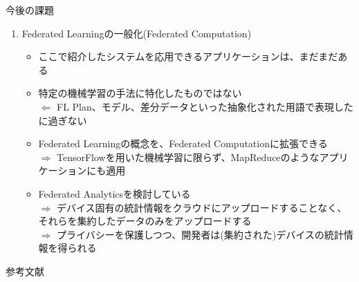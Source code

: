 \documentclass[dvipdfmx,notheorems,t]{beamer}
\begin{document}
\begin{frame}{今後の課題}
\begin{enumerate}
	\framebreak
	
	\item Federated Learningの一般化(Federated Computation)
	\begin{itemize}
		\item ここで紹介したシステムを応用できるアプリケーションは、まだまだある
		\newline
		
		\item 特定の機械学習の手法に特化したものではない \\
		$\Leftarrow$ FL Plan、モデル、差分データといった抽象化された用語で表現したに過ぎない
		\newline
		
		\item Federated Learningの概念を、Federated Computationに拡張できる \\
		$\Rightarrow$ TensorFlowを用いた機械学習に限らず、MapReduceのようなアプリケーションにも適用
		\newline
		
		\item Federated Analyticsを検討している \\
		$\Rightarrow$ デバイス固有の統計情報をクラウドにアップロードすることなく、それらを集約したデータのみをアップロードする \\
		$\Rightarrow$ プライバシーを保護しつつ、開発者は(集約された)デバイスの統計情報を得られる
	\end{itemize}
\end{enumerate}

\end{frame}

\begin{frame}{参考文献}




\end{frame}
\end{document}
